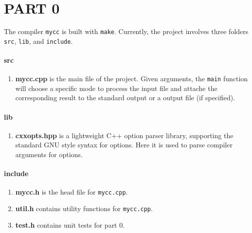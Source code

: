 \section*{PART 0}

The compiler \texttt{mycc} is built with \texttt{make}.
Currently, the project involves three folders 
\texttt{src}, \texttt{lib}, and \texttt{include}.

\paragraph{\large\textbf{src}} 
\begin{enumerate}
    \item \textbf{mycc.cpp} is the main file of the project. Given arguments, the \texttt{main} function will choose a specific mode to process the input file and attache the corresponding result to the standard output or a output file (if specified).
\end{enumerate}

\paragraph{\large\textbf{lib}} 
\begin{enumerate}
    \item \textbf{cxxopts.hpp} is a lightweight C++ option parser library, supporting the standard GNU style syntax for options. Here it is used to parse compiler arguments for options.
\end{enumerate}

\paragraph{\large\textbf{include}} 
\begin{enumerate}
    \item \textbf{mycc.h} is the head file for \texttt{mycc.cpp}.
    \item \textbf{util.h} contains utility functions for \texttt{mycc.cpp}.
    \item \textbf{test.h} contains unit tests for part 0.
\end{enumerate}
